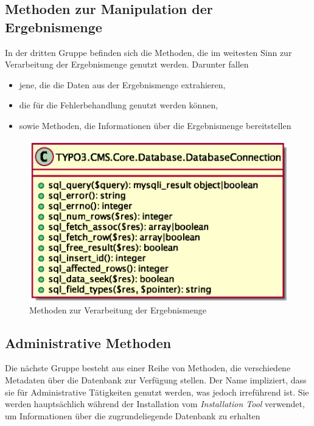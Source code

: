 \newpage
\subsection{Methoden zur Manipulation der Ergebnismenge}
In der dritten Gruppe befinden sich die Methoden, die im weitesten Sinn zur Verarbeitung der Ergebnismenge genutzt werden. Darunter fallen

\begin{itemize}
	\item jene, die die Daten aus der Ergebnismenge extrahieren,
	\item die für die Fehlerbehandlung genutzt werden können,
	\item sowie Methoden, die Informationen über die Ergebnismenge bereitstellen
\end{itemize}

\begin{figure}[H]
\centering
\includegraphics[scale=0.65]{gfx/uml/DatabaseConnectionFetchMethods.eps}
\caption{Methoden zur Verarbeitung der Ergebnismenge}
\label{fig:databaseConnectionWithResultsetsMethods}
\end{figure}


\subsection{Administrative Methoden}
Die nächste Gruppe besteht aus einer Reihe von Methoden, die verschiedene Metadaten über die Datenbank zur Verfügung stellen. Der Name impliziert, dass sie für Administrative Tätigkeiten genutzt werden, was jedoch irreführend ist. Sie werden hauptsächlich während der Installation vom \textit{Installation Tool} verwendet, um Informationen über die zugrundeliegende Datenbank zu erhalten

